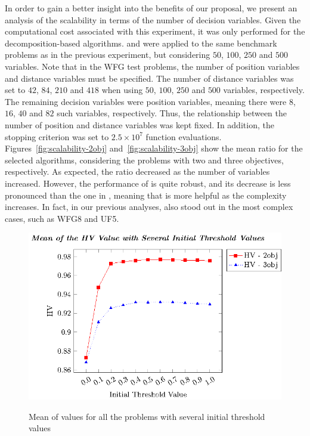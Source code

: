 In order to gain a better insight into the benefits of our proposal, we present an analysis of the scalability in terms of the number 
of decision variables.
%
Given the computational cost associated with this experiment, it was only performed for 
the decomposition-based algorithms.
%
\AVSDMOEAD{} and \MOEADDE{} were applied to the same benchmark problems as in the previous experiment, 
but considering $50$, $100$, $250$ and $500$ variables.
%
Note that in the WFG test problems, the number of position variables and distance variables must be specified.
%
The number of distance variables was set to $42$, $84$, $210$ and $418$ when using $50$, $100$, $250$ and $500$ 
variables, respectively.
%
The remaining decision variables were position variables, meaning there were $8$, $16$, $40$ and $82$ such variables, respectively.
%
Thus, the relationship between the number of position and distance variables was kept fixed.
%
In addition, the stopping criterion was set to $2.5 \times 10^7$ function evaluations.
%
Figures~\ref{fig:scalability-2obj} and~\ref{fig:scalability-3obj} show the mean \HV{} ratio for the selected algorithms, 
considering the problems with two and three objectives, respectively.
%
As expected, the \HV{} ratio decreased as the number of variables increased.
%
However, the performance of \AVSDMOEAD{} is quite robust, and its decrease is less pronounced than the one in \MOEADDE{},
meaning that \AVSDMOEAD{} is more helpful as the complexity increases.
%
In fact, in our previous analyses, \AVSDMOEAD{} also stood out in the most complex cases, such
as WFG8 and UF5.
%



\begin{figure}[t]
\centering
\includegraphics[scale=0.75]{images/Graphic-Initial-Distance_tikz-figure0.eps} \\
\caption{Mean of \HV{} values for all the problems with several initial threshold values}\label{fig:Initial-distance-factor}
\end{figure}


